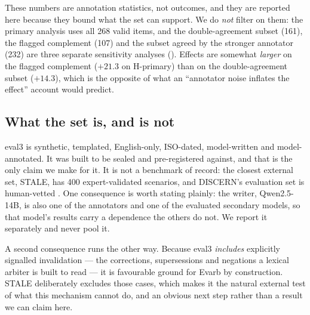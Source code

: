 These numbers are annotation statistics, not outcomes, and they are reported here because they bound what the set
can support. We do \emph{not} filter on them: the primary analysis uses all 268 valid items, and the
double-agreement subset (161), the flagged complement (107) and the subset agreed by the stronger annotator (232)
are three separate sensitivity analyses (). Effects are somewhat \emph{larger} on the
flagged complement ($+21.3$\pp{} on H-primary) than on the double-agreement subset ($+14.3$\pp), which is the
opposite of what an ``annotator noise inflates the effect'' account would predict.

\subsection{What the set is, and is not}

eval3 is synthetic, templated, English-only, ISO-dated, model-written and model-annotated. It was built to be
sealed and pre-registered against, and that is the only claim we make for it. It is not a benchmark of record: the
closest external set, STALE, has 400 expert-validated scenarios, and DISCERN's evaluation set is human-vetted
\citep{chao2026stale,ahuja2026discern}. One consequence is worth stating plainly: the writer, Qwen2.5-14B, is also
one of the annotators and one of the evaluated secondary models, so that model's results carry a dependence the
others do not. We report it separately and never pool it.

A second consequence runs the other way. Because eval3 \emph{includes} explicitly signalled invalidation --- the
corrections, supersessions and negations a lexical arbiter is built to read --- it is favourable ground for Evarb
by construction. STALE deliberately excludes those cases, which makes it the natural external test of what this
mechanism cannot do, and an obvious next step rather than a result we can claim here.
